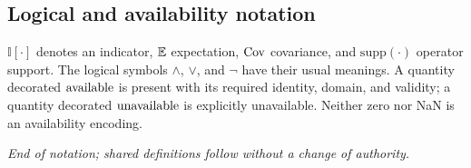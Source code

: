 \subsection{Logical and availability notation}

$\mathbb I[\cdot]$ denotes an indicator, $\mathbb E$ expectation, $\operatorname{Cov}$ covariance,
and $\mathrm{supp}(\cdot)$ operator support.  The logical symbols $\land$,
$\lor$, and $\neg$ have their usual meanings.  A quantity decorated
$\mathrm{available}$ is present with its required identity, domain, and validity; a
quantity decorated $\mathrm{unavailable}$ is explicitly unavailable.  Neither zero nor
NaN is an availability encoding.

\begin{center}
\textit{End of notation; shared definitions follow without a change of authority.}
\end{center}

